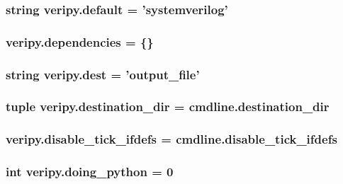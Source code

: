 \hypertarget{namespaceveripy_af8a33045ea5c3ce576ddaf55a5ff3c8f}{
\subsubsection[{default}]{\setlength{\rightskip}{0pt plus 5cm}string veripy.\-default = 'systemverilog'}}\label{namespaceveripy_af8a33045ea5c3ce576ddaf55a5ff3c8f}
\hypertarget{namespaceveripy_aebe879fba9bff8cd21ceb4e0ed71cfbd}{
\subsubsection[{dependencies}]{\setlength{\rightskip}{0pt plus 5cm}veripy.\-dependencies = \{\}}}\label{namespaceveripy_aebe879fba9bff8cd21ceb4e0ed71cfbd}
\hypertarget{namespaceveripy_ab5498e8a8340e80959241b4ca4ba5dc5}{
\subsubsection[{dest}]{\setlength{\rightskip}{0pt plus 5cm}string veripy.\-dest = '{\bf output\-\_\-file}'}}\label{namespaceveripy_ab5498e8a8340e80959241b4ca4ba5dc5}
\hypertarget{namespaceveripy_a375e1799aa8688667cbbc85190d8f362}{
\subsubsection[{destination\-\_\-dir}]{\setlength{\rightskip}{0pt plus 5cm}tuple veripy.\-destination\-\_\-dir = cmdline.\-destination\-\_\-dir}}\label{namespaceveripy_a375e1799aa8688667cbbc85190d8f362}
\hypertarget{namespaceveripy_acb8d40a5e53e8dfb03b5cc54272b1798}{
\subsubsection[{disable\-\_\-tick\-\_\-ifdefs}]{\setlength{\rightskip}{0pt plus 5cm}veripy.\-disable\-\_\-tick\-\_\-ifdefs = cmdline.\-disable\-\_\-tick\-\_\-ifdefs}}\label{namespaceveripy_acb8d40a5e53e8dfb03b5cc54272b1798}
\hypertarget{namespaceveripy_aacb0f311e69b18de8f0222b583ca9d33}{
\subsubsection[{doing\-\_\-python}]{\setlength{\rightskip}{0pt plus 5cm}int veripy.\-doing\-\_\-python = 0}}\label{namespaceveripy_aacb0f311e69b18de8f0222b583ca9d33}
